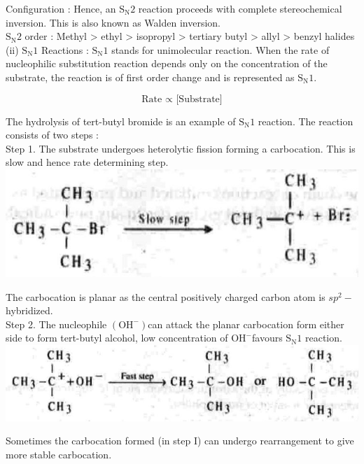 \documentclass[10pt]{article}
\begin{document}
Configuration : Hence, an $\mathrm{S}_{\mathrm{N}} 2$ reaction proceeds with complete stereochemical inversion. This is also known as Walden inversion.\\
$\mathrm{S}_{\mathrm{N}} 2$ order : Methyl > ethyl > isopropyl > tertiary butyl > allyl > benzyl halides\\
(ii) $\mathrm{S}_{\mathrm{N}} 1$ Reactions : $\mathrm{S}_{\mathrm{N}} 1$ stands for unimolecular reaction. When the rate of nucleophilic substitution reaction depends only on the concentration of the substrate, the reaction is of first order change and is represented as $\mathrm{S}_{\mathrm{N}} 1$.

$$
\text { Rate } \propto \text { [Substrate] }
$$

The hydrolysis of tert-butyl bromide is an example of $\mathrm{S}_{\mathrm{N}} 1$ reaction. The reaction consists of two steps :\\
Step 1. The substrate undergoes heterolytic fission forming a carbocation. This is slow and hence rate determining step.\\
\includegraphics[max width=\textwidth, center]{2025_01_28_8470952b98110cec3aabg-092}

The carbocation is planar as the central positively charged carbon atom is $s p^{2}-$ hybridized.\\
Step 2. The nucleophile $\left(\mathrm{OH}^{-}\right)$can attack the planar carbocation form either side to form tert-butyl alcohol, low concentration of $\mathrm{OH}^{-}$favours $\mathrm{S}_{\mathrm{N}} 1$ reaction.\\
\includegraphics[max width=\textwidth, center]{2025_01_28_8470952b98110cec3aabg-092(2)}

Sometimes the carbocation formed (in step I) can undergo rearrangement to give more stable carbocation.
\end{document}
